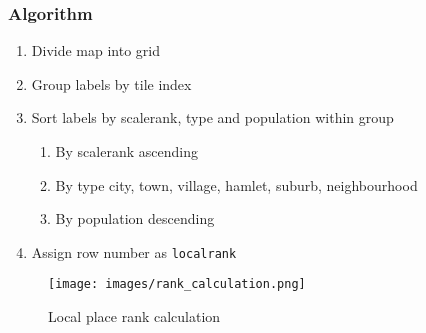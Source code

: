 \subsubsection*{Algorithm}

\begin{enumerate}  
    \item Divide map into grid
    \item Group labels by tile index
    \item Sort labels by scalerank, type and population within group
    \begin{enumerate}
        \item By scalerank ascending
        \item By type city, town, village, hamlet, suburb, neighbourhood
        \item By population descending
    \end{enumerate}
    \item Assign row number as \texttt{localrank}
\end{enumerate}


\begin{figure}[H]
\centering
\texttt{[image: images/rank\_calculation.png]}
\caption{Local place rank calculation}
\end{figure}

